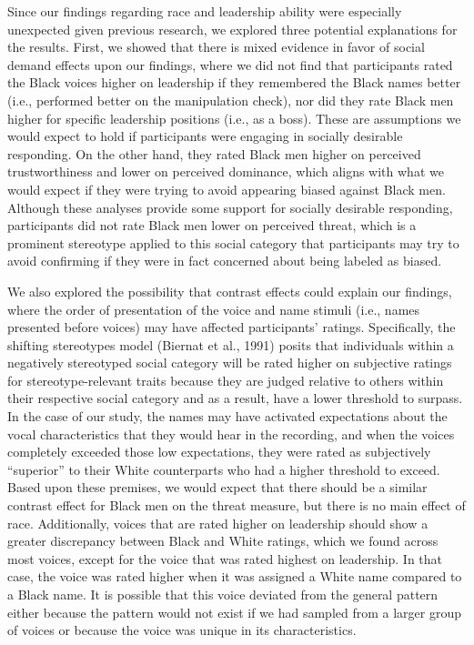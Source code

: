 \documentclass[
  english,
  man]{apa6}
\begin{document}
Since our findings regarding race and leadership ability were especially unexpected given previous research, we explored three potential explanations for the results. First, we showed that there is mixed evidence in favor of social demand effects upon our findings, where we did not find that participants rated the Black voices higher on leadership if they remembered the Black names better (i.e., performed better on the manipulation check), nor did they rate Black men higher for specific leadership positions (i.e., as a boss). These are assumptions we would expect to hold if participants were engaging in socially desirable responding. On the other hand, they rated Black men higher on perceived trustworthiness and lower on perceived dominance, which aligns with what we would expect if they were trying to avoid appearing biased against Black men. Although these analyses provide some support for socially desirable responding, participants did not rate Black men lower on perceived threat, which is a prominent stereotype applied to this social category that participants may try to avoid confirming if they were in fact concerned about being labeled as biased.

We also explored the possibility that contrast effects could explain our findings, where the order of presentation of the voice and name stimuli (i.e., names presented before voices) may have affected participants' ratings. Specifically, the shifting stereotypes model (Biernat et al., 1991) posits that individuals within a negatively stereotyped social category will be rated higher on subjective ratings for stereotype-relevant traits because they are judged relative to others within their respective social category and as a result, have a lower threshold to surpass. In the case of our study, the names may have activated expectations about the vocal characteristics that they would hear in the recording, and when the voices completely exceeded those low expectations, they were rated as subjectively \enquote{superior} to their White counterparts who had a higher threshold to exceed. Based upon these premises, we would expect that there should be a similar contrast effect for Black men on the threat measure, but there is no main effect of race. Additionally, voices that are rated higher on leadership should show a greater discrepancy between Black and White ratings, which we found across most voices, except for the voice that was rated highest on leadership. In that case, the voice was rated higher when it was assigned a White name compared to a Black name. It is possible that this voice deviated from the general pattern either because the pattern would not exist if we had sampled from a larger group of voices or because the voice was unique in its characteristics.
\end{document}
